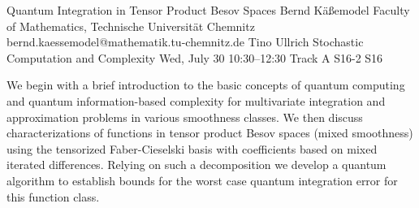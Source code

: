 \begin{talk}
  {Quantum Integration in Tensor Product  Besov Spaces}%
  {Bernd Käßemodel}%
  {Faculty of Mathematics, Technische Universität Chemnitz}%
  {bernd.kaessemodel@mathematik.tu-chemnitz.de}%
  {Tino Ullrich}%
  {Stochastic Computation and Complexity}%
  {Wed, July 30 10:30–12:30 Track A}%
  {S16-2}%
  {S16}%
				

We begin with a brief introduction to the basic concepts of quantum computing and quantum information-based complexity for multivariate integration and approximation problems in various smoothness classes. We then discuss characterizations of functions in tensor product Besov spaces (mixed smoothness) using the tensorized Faber-Cieselski basis with coefficients based on mixed iterated differences. Relying on such a decomposition we develop a quantum algorithm to establish bounds for the worst case quantum integration error for this function class. 

\medskip
%
%
\end{talk}


